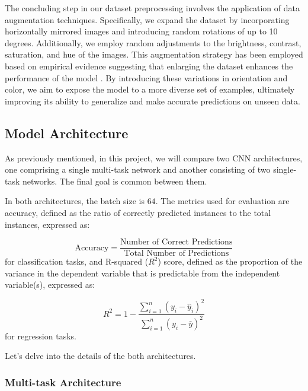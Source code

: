 The concluding step in our dataset preprocessing involves the application
of data augmentation techniques. Specifically, we expand the dataset
by incorporating horizontally mirrored images and introducing random
rotations of up to 10 degrees. Additionally, we employ random adjustments
to the brightness, contrast, saturation, and hue of the images.
This augmentation strategy has been employed based on empirical
evidence suggesting that enlarging the dataset enhances the performance
of the model \cite{app4}. By introducing these variations in orientation and color,
we aim to expose the model to a more diverse set of examples,
ultimately improving its ability to generalize and make accurate
predictions on unseen data.

\subsection{Model Architecture} \label{sec:model}

As previously mentioned, in this project, we will compare two
CNN architectures, one comprising a single multi-task
network and another consisting of two single-task networks.
The final goal is common between them.

In both architectures, the batch size is $64$.
The metrics used for evaluation are accuracy, defined as the ratio
of correctly predicted instances to the total instances, expressed as:

\[
\text{{Accuracy}} = \frac{\text{{Number of Correct Predictions}}}{\text{{Total Number of Predictions}}}
\]
for classification tasks, and R-squared ($R^2$) score, defined as the proportion of the variance in the dependent variable that is predictable from the independent variable(s), expressed as:

\[
R^2 = 1 - \frac{\sum_{i=1}^{n} (y_i - \hat{y}_i)^2}{\sum_{i=1}^{n} (y_i - \bar{y})^2}
\]
for regression tasks.

Let's delve into the details of the both architectures.

\subsubsection{Multi-task Architecture} \label{sec:multi}

